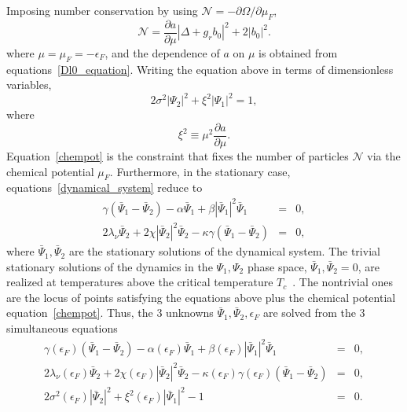 \documentclass[a4paper,10pt]{article}
\begin{document}
Imposing number conservation by using $\mathcal{N} = - {\partial\Omega}/{\partial\mu_F}$, 
\begin{equation}
\label{eq:numfb}
\mathcal{N} = \frac{\partial a}{\partial\mu} |\Delta + g_rb_0|^2 + 2 |b_0|^2.
\end{equation}
where $\mu=\mu_F=-\epsilon_F$, and the dependence of $a$ on $\mu$ is obtained from equations~\ref{Dl0_equation}. Writing the equation above  in terms of dimensionless variables, 
\begin{equation}
\label{chempot}
 2 \sigma^2|\Psi_2|^2 + \xi^2 |\Psi_1|^2 = 1, 
\end{equation}
where 
\begin{equation}
\label{xisq}
\xi^2 \equiv \mu^2\frac{\partial a}{\partial \mu}.
\end{equation}
Equation~\ref{chempot} is the constraint that fixes the number of particles $\mathcal{N}$ via the chemical potential $\mu_F$. Furthermore, in the stationary case, equations~\ref{dynamical_system} reduce to
\begin{eqnarray}
\label{fpcomplex}
\gamma \left(  \bar{\Psi}_1- \bar{\Psi}_2 \right) - \alpha  \bar{\Psi}_1 +\beta | \bar{\Psi}_1|^2  \bar{\Psi}_1 &=& 0, \nonumber \\
2\lambda_\nu  \bar{\Psi}_2 +2 \chi| \bar{\Psi}_2|^2 \bar{\Psi}_2 - \kappa\gamma \left( \bar{\Psi}_1- \bar{\Psi}_2 \right) &=& 0,
\end{eqnarray}
where $ \bar{\Psi}_1, \bar{\Psi}_2$ are the stationary solutions of the dynamical system. The trivial stationary solutions of the dynamics in the $\Psi_1,\Psi_2$ phase space, $ \bar{\Psi}_1, \bar{\Psi}_2=0$, are realized at temperatures above the critical temperature $T_c$~\cite{huang:bcsbecgp}. The nontrivial ones are the locus of points satisfying the equations above plus the chemical potential equation~\ref{chempot}. Thus, the 3 unknowns $ \bar{\Psi}_1, \bar{\Psi}_2,\epsilon_F$ are solved from the 3 simultaneous equations
\begin{eqnarray}
\label{fixedpoints}
\gamma\left(\epsilon_F\right) \left(  \bar{\Psi}_1- \bar{\Psi}_2 \right) - \alpha\left(\epsilon_F\right)  \bar{\Psi}_1 +\beta\left(\epsilon_F\right) | \bar{\Psi}_1|^2  \bar{\Psi}_1 &=& 0, \nonumber \\
2\lambda_\nu\left(\epsilon_F\right)  \bar{\Psi}_2 +2 \chi\left(\epsilon_F\right)| \bar{\Psi}_2|^2 \bar{\Psi}_2 - \kappa\left(\epsilon_F\right)\gamma\left(\epsilon_F\right) \left( \bar{\Psi}_1- \bar{\Psi}_2 \right) &=& 0, \nonumber \\
2 \sigma^2(\epsilon_F) | \bar{\Psi}_2|^2 + \xi^2(\epsilon_F) | \bar{\Psi}_1|^2 -1 &=& 0.
\end{eqnarray}
\end{document}
